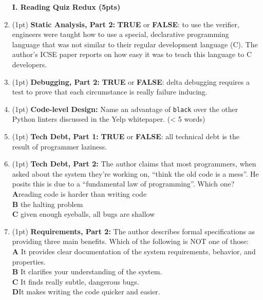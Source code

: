 \documentclass{report}
\newif\ifkey
\newcommand{\correct}[1]{\ifkey\color{red}\textbf{#1}\color{black}\else\textbf{#1}\fi\xspace}
\newcommand{\answershort}[1]{\ifkey\color{red}\underline{\textbf{#1}}\color{black}\else\underline{\hspace{3in}}\fi\xspace}
\newcommand*{\pts}[1]{\addtocounter{points}{#1}(#1pt)}
\begin{document}
\begin{spacing}{1.4}
\begin{enumerate}[leftmargin=*]
\newpage

\textbf{I. Reading Quiz Redux (5pts)}

\item \pts{1}
  \textbf{Static Analysis, Part 2:} \textbf{TRUE} or
  \correct{FALSE}: to use the verifier, engineers were taught how to
  use a special, declarative programming language that was not similar
  to their regular development language (C). The author's ICSE paper
  reports on how easy it was to teach this language to C developers.

\item \pts{1}
  \textbf{Debugging, Part 2:} \correct{TRUE} or \textbf{FALSE}:
  delta debugging requires a test to prove that each circumstance is really failure inducing.

\item \pts{1}
  \textbf{Code-level Design:} Name an advantage of \texttt{black} over the other Python linters discussed in the Yelp whitepaper. (< 5 words)
  \\ \answershort{any of: opinionated; resolves errors automatically; consistency}

\item \pts{1}
  \textbf{Tech Debt, Part 1:} \textbf{TRUE} or \correct{FALSE}:
  all technical debt is the result of programmer laziness.

\item \pts{1}
  \textbf{Tech Debt, Part 2:}
  The author claims that most programmers, when asked about the system they’re working on, “think the old code is a mess”. He posits this is due to a “fundamental law of programming”. Which one?
  \\ \correct{A}\hspace{0.2in}reading code is harder than writing code
  \\ \textbf{B}\hspace{0.2in} the halting problem
  \\ \textbf{C}\hspace{0.2in} given enough eyeballs, all bugs are shallow

\item \pts{1}
  \textbf{Requirements, Part 2:}
  The author describes formal specifications as providing three main benefits. Which of the following is NOT one of those:
  \\ \textbf{A}\hspace{0.2in} It provides clear documentation of the system requirements, behavior, and properties.
  \\ \textbf{B}\hspace{0.2in} It clarifies your understanding of the system.
  \\ \textbf{C}\hspace{0.2in} It finds really subtle, dangerous bugs.
  \\ \correct{D}\hspace{0.2in}It makes writing the code quicker and easier.


\end{enumerate}
\end{spacing}
\end{document}
